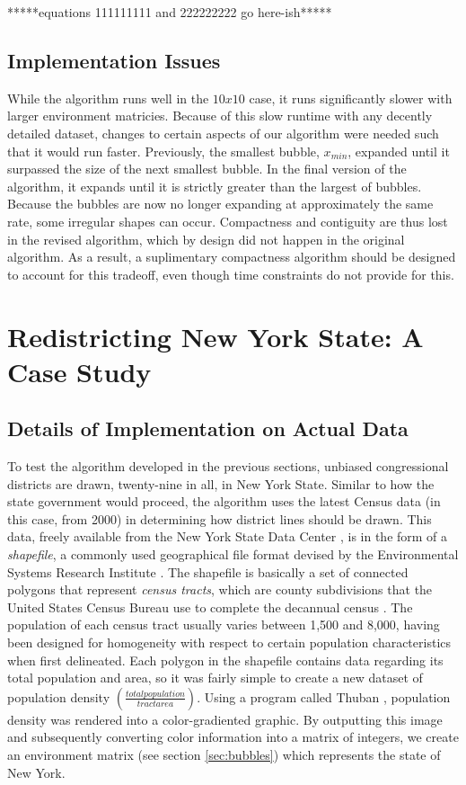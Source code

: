 \documentclass[11pt]{article}				%
\begin{document}
*****equations 111111111 and 222222222 go here-ish*****

	\subsection{Implementation Issues}

While the algorithm runs well in the $10 x 10$ case, it runs
significantly slower with larger environment matricies. Because of this
slow runtime with any decently detailed dataset, changes to certain
aspects of our algorithm were needed such that it would run faster.
Previously, the smallest bubble, $x_{min}$, expanded until it surpassed
the size of the next smallest bubble. In the final version of the
algorithm, it expands until it is strictly greater than the largest of
bubbles. Because the bubbles are now no longer expanding at approximately 
the same rate, some irregular shapes can occur. Compactness and contiguity are thus lost in the revised algorithm, 
which by design did not happen in the original algorithm. As a result, a
suplimentary compactness algorithm should be designed to account for
this tradeoff, even though time constraints do not provide for this.
	
\section{Redistricting New York State: A Case Study}

	\subsection{Details of Implementation on Actual Data}

To test the algorithm developed in the previous sections, unbiased
congressional districts are drawn, twenty-nine in all, in New York State. 
Similar to how the state government would proceed, the algorithm uses the 
latest Census data (in this case, from 2000) in determining how district
lines should be drawn. This data, freely available from the New York
State Data Center \cite{ref:census}, is in the form of a
\textit{shapefile}, a commonly used geographical file format devised by
the Environmental Systems Research Institute \cite{ref:shapefile}. The
shapefile is basically a set of connected polygons that represent
\textit{census tracts}, which are county subdivisions that the United
States Census Bureau use to complete the decannual census
\cite{ref:tracts}. The population of each census tract usually varies
between 1,500 and 8,000, having been designed for homogeneity with
respect to certain population characteristics when first delineated. Each 
polygon in the shapefile contains data regarding its total population and 
area, so it was fairly simple to create a new dataset of population
density $\left( \frac{total population}{tract area}\right) $. Using a
program called Thuban \cite{ref:thuban}, population density was rendered
into a color-gradiented graphic. By outputting this image and
subsequently converting color information into a matrix of integers, we
create an environment matrix (see section \ref{sec:bubbles}) which
represents the state of New York. 
\end{document}
